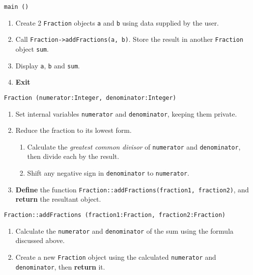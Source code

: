 \clearpage
\algorithm
\texttt{main ()}
\begin{enumerate}
	\item Create 2 \texttt{Fraction} objects \texttt{a} and \texttt{b} using data supplied by the user.
	\item Call \texttt{Fraction->addFractions(a, b)}. Store the result in another \texttt{Fraction} object \texttt{sum}.
	\item Display \texttt{a}, \texttt{b} and \texttt{sum}. 
	\item \textbf{Exit} 
\end{enumerate}
\vspace{8mm}
\texttt{Fraction (numerator:Integer, denominator:Integer)}
\begin{enumerate}
	\item Set internal variables \texttt{numerator} and \texttt{denominator}, keeping them private.
	\item Reduce the fraction to its lowest form.
	\begin{enumerate}
		\item Calculate the \textit{greatest common divisor} of \texttt{numerator} and \texttt{denominator}, then divide
			each by the result.
		\item Shift any negative sign in \texttt{denominator} to \texttt{numerator}. 
	\end{enumerate}
	\item \textbf{Define} the function \texttt{Fraction::addFractions(fraction1, fraction2)}, and \textbf{return} the resultant object. 
\end{enumerate}
\vspace{5mm}
\texttt{Fraction::addFractions (fraction1:Fraction, fraction2:Fraction)}
\begin{enumerate}
	\item Calculate the \texttt{numerator} and \texttt{denominator} of the sum using the formula discussed above.
	\item Create a new \texttt{Fraction} object using the calculated \texttt{numerator} and \texttt{denominator}, then \textbf{return} it.
\end{enumerate}

\sourcecode

\clearpage


